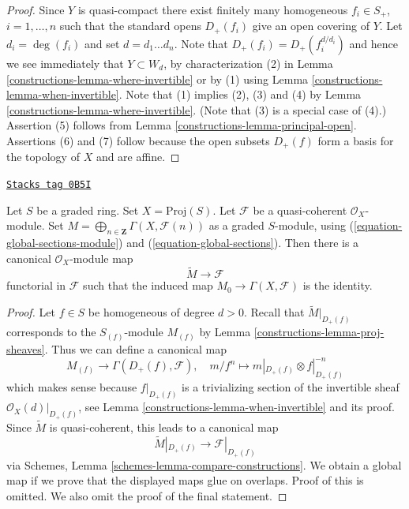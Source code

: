 \begin{proof}

Since $Y$ is quasi-compact there exist finitely many homogeneous
$f_i \in S_{+}$, $i = 1, \ldots, n$ such that the standard opens
$D_{+}(f_i)$ give an open covering of $Y$. Let $d_i = \deg(f_i)$ and set
$d = d_1 \ldots d_n$. Note that $D_{+}(f_i) = D_{+}(f_i^{d/d_i})$
and hence we see immediately that $Y \subset W_d$, by characterization
(2) in Lemma \ref{constructions-lemma-where-invertible} or
by (1) using Lemma \ref{constructions-lemma-when-invertible}.
Note that (1) implies (2), (3) and (4) by Lemma \ref{constructions-lemma-where-invertible}.
(Note that (3) is a special case of (4).)
Assertion (5) follows from Lemma \ref{constructions-lemma-principal-open}.
Assertions (6) and (7) follow because the open subsets $D_{+}(f)$
form a basis for the topology of $X$ and are affine.
\end{proof}

\begin{lemma}
\label{constructions-lemma-comparison-proj-quasi-coherent}
\href{https://stacks.math.columbia.edu/tag/0B5I}{\texttt{Stacks tag 0B5I}}

Let $S$ be a graded ring. Set $X = \text{Proj}(S)$.
Let $\mathcal{F}$ be a quasi-coherent $\mathcal{O}_X$-module.
Set $M = \bigoplus_{n \in \mathbf{Z}} \Gamma(X, \mathcal{F}(n))$ as
a graded $S$-module, using
(\ref{equation-global-sections-module}) and (\ref{equation-global-sections}).
Then there is a canonical $\mathcal{O}_X$-module map
$$
\widetilde{M} \longrightarrow \mathcal{F}
$$
functorial in $\mathcal{F}$ such that the induced map
$M_0 \to \Gamma(X, \mathcal{F})$ is the identity.
\end{lemma}

\begin{proof}

Let $f \in S$ be homogeneous of degree $d > 0$. Recall that
$\widetilde{M}|_{D_{+}(f)}$ corresponds to the
$S_{(f)}$-module $M_{(f)}$ by Lemma \ref{constructions-lemma-proj-sheaves}.
Thus we can define a canonical map
$$
M_{(f)} \longrightarrow \Gamma(D_+(f), \mathcal{F}),\quad
m/f^n \longmapsto m|_{D_+(f)} \otimes f|_{D_+(f)}^{-n}
$$
which makes sense because $f|_{D_+(f)}$ is a trivializing
section of the invertible sheaf $\mathcal{O}_X(d)|_{D_+(f)}$, see
Lemma \ref{constructions-lemma-when-invertible} and its proof.
Since $\widetilde{M}$ is quasi-coherent, this leads to a canonical
map
$$
\widetilde{M}|_{D_+(f)} \longrightarrow \mathcal{F}|_{D_+(f)}
$$
via Schemes, Lemma \ref{schemes-lemma-compare-constructions}.
We obtain a global map if we prove that the displayed maps glue on overlaps.
Proof of this is omitted. We also omit the proof of the final statement.
\end{proof}

